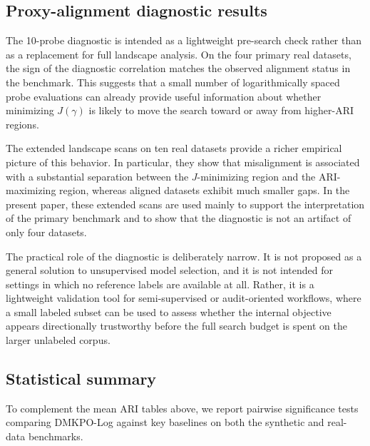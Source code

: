 \documentclass[10pt,lineno]{wlpeerj}
\begin{document}
\subsection*{Proxy-alignment diagnostic results}

The 10-probe diagnostic is intended as a lightweight pre-search check rather than as a replacement for full landscape analysis. On the four primary real datasets, the sign of the diagnostic correlation matches the observed alignment status in the benchmark. This suggests that a small number of logarithmically spaced probe evaluations can already provide useful information about whether minimizing $J(\gamma)$ is likely to move the search toward or away from higher-ARI regions.

The extended landscape scans on ten real datasets provide a richer empirical picture of this behavior. In particular, they show that misalignment is associated with a substantial separation between the $J$-minimizing region and the ARI-maximizing region, whereas aligned datasets exhibit much smaller gaps. In the present paper, these extended scans are used mainly to support the interpretation of the primary benchmark and to show that the diagnostic is not an artifact of only four datasets.

The practical role of the diagnostic is deliberately narrow. It is not proposed as a general solution to unsupervised model selection, and it is not intended for settings in which no reference labels are available at all. Rather, it is a lightweight validation tool for semi-supervised or audit-oriented workflows, where a small labeled subset can be used to assess whether the internal objective appears directionally trustworthy before the full search budget is spent on the larger unlabeled corpus.

\subsection*{Statistical summary}

To complement the mean ARI tables above, we report pairwise significance tests comparing DMKPO-Log against key baselines on both the synthetic and real-data benchmarks.
\end{document}
